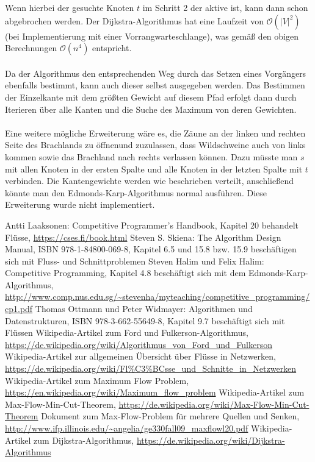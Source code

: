 \documentclass[a4paper, notitlepage, 12pt]{scrartcl}
\begin{document}
Wenn hierbei der gesuchte Knoten $t$ im Schritt 2 der aktive ist, kann dann schon abgebrochen werden.
Der Dijkstra-Algorithmus hat eine Laufzeit von $\mathcal{O}(|V|^{2})$ (bei Implementierung mit einer Vorrangwarteschlange), was gemäß den obigen Berechnungen $\mathcal{O}(n^{4})$ entspricht. \\ \\ Da der Algorithmus den entsprechenden Weg durch das Setzen eines Vorgängers ebenfalls bestimmt, kann auch dieser selbst ausgegeben werden. Das Bestimmen der Einzelkante mit dem größten Gewicht auf diesem Pfad erfolgt dann durch Iterieren über alle Kanten und die Suche des Maximum von deren Gewichten. \\ \\
Eine weitere mögliche Erweiterung wäre es, die Zäune an der linken und rechten Seite des Brachlands zu \glqq öffnen\grqq und zuzulassen, dass Wildschweine auch von links kommen sowie das Brachland nach rechts verlassen können. Dazu müsste man $s$ mit allen Knoten in der ersten Spalte und alle Knoten in der letzten Spalte mit $t$ verbinden. Die Kantengewichte werden wie beschrieben verteilt, anschließend könnte man den Edmonds-Karp-Algorithmus normal ausführen. Diese Erweiterung wurde nicht implementiert.
\begin{thebibliography}{xx}
 Antti Laaksonen: Competitive Programmer’s Handbook, Kapitel 20 behandelt Flüsse, \url{https://cses.fi/book.html} 
 Steven S. Skiena: The Algorithm Design Manual, ISBN 978-1-84800-069-8, Kapitel 6.5 und 15.8 bzw. 15.9 beschäftigen sich mit Fluss- und Schnittproblemen
 Steven Halim und Felix Halim: Competitive Programming, Kapitel 4.8 beschäftigt sich mit dem Edmonds-Karp-Algorithmus, \url{http://www.comp.nus.edu.sg/~stevenha/myteaching/competitive_programming/cp1.pdf}
 Thomas Ottmann und Peter Widmayer: Algorithmen und Datenstrukturen, ISBN 978-3-662-55649-8, Kapitel 9.7 beschäftigt sich mit Flüssen
 Wikipedia-Artikel zum Ford und Fulkerson-Algorithmus, \url{https://de.wikipedia.org/wiki/Algorithmus_von_Ford_und_Fulkerson}
 Wikipedia-Artikel zur allgemeinen Übersicht über Flüsse in Netzwerken, \url{https://de.wikipedia.org/wiki/Fl\%C3\%BCsse_und_Schnitte_in_Netzwerken}
 Wikipedia-Artikel zum Maximum Flow Problem, \url{https://en.wikipedia.org/wiki/Maximum_flow_problem}
 Wikipedia-Artikel zum Max-Flow-Min-Cut-Theorem, \url{https://de.wikipedia.org/wiki/Max-Flow-Min-Cut-Theorem}
 Dokument zum Max-Flow-Problem für mehrere Quellen und Senken, \url{http://www.ifp.illinois.edu/~angelia/ge330fall09_maxflowl20.pdf}
 Wikipedia-Artikel zum Dijkstra-Algorithmus, \url{https://de.wikipedia.org/wiki/Dijkstra-Algorithmus}
\end{thebibliography}
\end{document}
